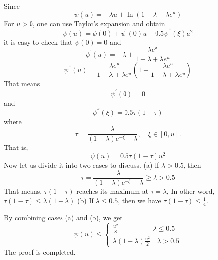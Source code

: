 \documentclass[journal]{IEEEtran}
\begin{document}
\begin{IEEEproof}

Since
\begin{equation}
  \psi(u)=-\lambda u+\ln(1-\lambda+\lambda e^u)
\end{equation}
For $u>0$, one can use Taylor's expansion and obtain
\begin{equation}
  \psi(u)=\psi(0)+\psi^{'}(0)u+0.5\psi^{''}(\xi)u^2
\end{equation}
it is easy to check that $\psi(0)=0$ and
\begin{equation}
  \psi^{'}(u)=-\lambda + \frac{\lambda e^u}{1-\lambda +\lambda e^u}
\end{equation}
\begin{equation}
  \psi^{''}(u)= \frac{\lambda e^u}{1-\lambda +\lambda e^u}(1-\frac{\lambda e^u}{1-\lambda +\lambda e^u})
\end{equation}
 That means
 \begin{equation*}
  \psi^{'}(0)=0
 \end{equation*}
  and
 \begin{equation}
  \psi^{''}(\xi)= 0.5 \tau (1-\tau)
\end{equation}
where
\begin{equation}
\tau =\frac{\lambda}{(1-\lambda)e^{-\xi}+\lambda}, \quad \xi\in[0,u] .
\end{equation}
That is,
\begin{equation}
\psi(u)=0.5 \tau (1-\tau)u^2
\end{equation}
Now let us divide it into two cases to discuss.
(a) If $\lambda >0.5$, then
\begin{equation}
   \tau=\frac{\lambda}{(1-\lambda)e^{-\xi}+\lambda}\geq\lambda>0.5
 \end{equation}
 That means,
  $\tau(1-\tau)$ reaches its maximum at $\tau=\lambda$,
  In other word,
  $\tau(1-\tau)\leq \lambda (1-\lambda)$
 (b) If $\lambda \leq 0.5$, then we have $\tau(1-\tau)\leq \frac{1}{4}$.

  By combining cases (a) and (b), we get
  \begin{equation}
\psi (u) \leq \begin{cases} \frac{u^2}{8}\quad \quad \quad \quad \quad \lambda \leq 0.5 \\
\lambda (1-\lambda) \frac{u^2}{2} \quad \lambda >0.5
\end{cases}
\end{equation}
The proof is completed.

\end{IEEEproof}
\end{document}
